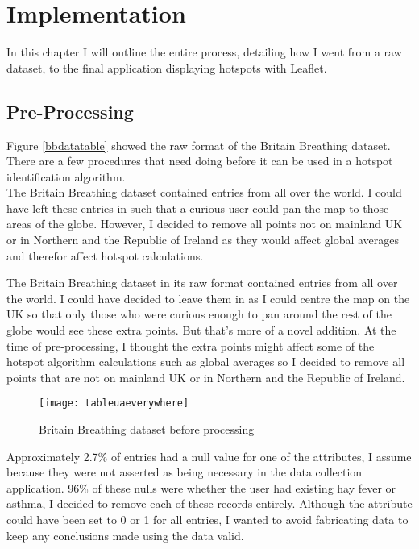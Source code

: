 \chapter{Implementation}
\label{cha:impl}

In this chapter I will outline the entire process, detailing how I went from a raw dataset, to the final application displaying hotspots with Leaflet.

\section{Pre-Processing}

Figure \ref{bbdatatable} showed the raw format of the Britain Breathing dataset. There are a few procedures that need doing before it can be used in a hotspot identification algorithm.\\

The Britain Breathing dataset contained entries from all over the world. I could have left these entries in such that a curious user could pan the map to those areas of the globe. However, I decided to remove all points not on mainland UK or in Northern and the Republic of Ireland as they would affect global averages and therefor affect hotspot calculations.

The Britain Breathing dataset in its raw format contained entries from all over the world. I could have decided to leave them in as I could centre the map on the UK so that only those who were curious enough to pan around the rest of the globe would see these extra points. But that's more of a novel addition. At the time of pre-processing, I thought the extra points might affect some of the hotspot algorithm calculations such as global averages so I decided to remove all points that are not on mainland UK or in Northern and the Republic of Ireland.\\

\begin{figure}[H]
\begin{center}
\texttt{[image: tableuaeverywhere]}
\caption{Britain Breathing dataset before processing}
\label{fig:RTv1}
\end{center}
\end{figure}

Approximately 2.7\% of entries had a null value for one of the attributes, I assume because they were not asserted as being necessary in the data collection application. 96\% of these nulls were  whether the user had existing hay fever or asthma, I decided to remove each of these records entirely. Although the attribute could have been set to 0 or 1 for all entries, I wanted to avoid fabricating data to keep any conclusions made using the data valid.


